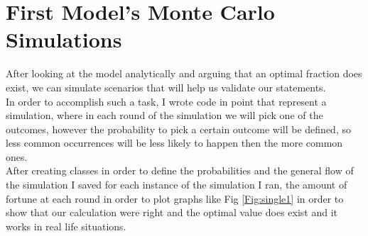 \documentclass{article}
\begin{document}
	\section{First Model's Monte Carlo Simulations}
	After looking at the model analytically and arguing that an optimal fraction does exist, we can simulate scenarios that will help us validate our statements.\\
	In order to accomplish such a task, I wrote code in point that represent a simulation, where in each round of the simulation we will pick one of the outcomes, however the probability to pick a certain outcome will be defined, so less common occurrences will be less likely to happen then the more common ones.\\
	After creating classes in order to define the probabilities and the general flow of the simulation I saved for each instance of the simulation I ran, the amount of fortune at each round in order to plot graphs like Fig \ref{Fig:single1} in order to show that our calculation were right and the optimal value does exist and it works in real life situations.\\
\end{document}
